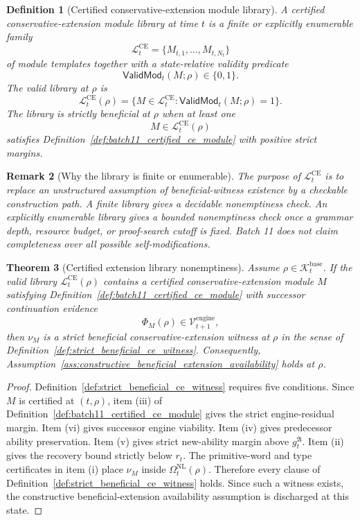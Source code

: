 \documentclass[11pt]{article}
\newtheorem{theorem}{Theorem}[section]
\newtheorem{definition}[theorem]{Definition}
\newtheorem{remark}[theorem]{Remark}
\newcommand{\Lcal}{\mathcal{L}}
\newcommand{\1}{\mathbf{1}}
\providecommand{\Kcal}{\mathcal{K}}
\providecommand{\Vcal}{\mathcal{V}}
\begin{document}
\begin{definition}[Certified conservative-extension module library]
\label{def:batch11_ce_module_library}
A certified conservative-extension module library at time \(t\) is a finite or explicitly enumerable family
\[
\Lcal_t^{\mathrm{CE}}
=
\{M_{t,1},\ldots,M_{t,N_t}\}
\]
of module templates together with a state-relative validity predicate
\[
\mathsf{ValidMod}_t(M;\rho)\in\{0,1\}.
\]
The valid library at \(\rho\) is
\[
\Lcal_t^{\mathrm{CE}}(\rho)
=
\{M\in\Lcal_t^{\mathrm{CE}}:\mathsf{ValidMod}_t(M;\rho)=1\}.
\]
The library is \emph{strictly beneficial at \(\rho\)} when at least one
\[
M\in\Lcal_t^{\mathrm{CE}}(\rho)
\]
satisfies Definition~\ref{def:batch11_certified_ce_module} with positive strict margins.
\end{definition}

\begin{remark}[Why the library is finite or enumerable]
The purpose of \(\Lcal_t^{\mathrm{CE}}\) is to replace an unstructured assumption of beneficial-witness existence by a checkable construction path.  A finite library gives a decidable nonemptiness check.  An explicitly enumerable library gives a bounded nonemptiness check once a grammar depth, resource budget, or proof-search cutoff is fixed.  Batch 11 does not claim completeness over all possible self-modifications.
\end{remark}

\begin{theorem}[Certified extension library nonemptiness]
\label{thm:batch11_certified_extension_library_nonemptiness}
Assume \(\rho\in\Kcal_t^{\mathrm{base}}\).  If the valid library \(\Lcal_t^{\mathrm{CE}}(\rho)\) contains a certified conservative-extension module \(M\) satisfying Definition~\ref{def:batch11_certified_ce_module} with successor continuation evidence
\[
\Phi_M(\rho)\in\Vcal_{t+1}^{\mathrm{engine}},
\]
then \(\nu_M\) is a strict beneficial conservative-extension witness at \(\rho\) in the sense of Definition~\ref{def:strict_beneficial_ce_witness}.  Consequently, Assumption~\ref{ass:constructive_beneficial_extension_availability} holds at \(\rho\).
\end{theorem}

\begin{proof}
Definition~\ref{def:strict_beneficial_ce_witness} requires five conditions.  Since \(M\) is certified at \((t,\rho)\), item (iii) of Definition~\ref{def:batch11_certified_ce_module} gives the strict engine-residual margin.  Item (vi) gives successor engine viability.  Item (iv) gives predecessor ability preservation.  Item (v) gives strict new-ability margin above \(g_t^{\mathfrak A}\).  Item (ii) gives the recovery bound strictly below \(r_t\).  The primitive-word and type certificates in item (i) place \(\nu_M\) inside \(\Omega_t^{\mathrm{NL}}(\rho)\).  Therefore every clause of Definition~\ref{def:strict_beneficial_ce_witness} holds.  Since such a witness exists, the constructive beneficial-extension availability assumption is discharged at this state.
\end{proof}
\end{document}
